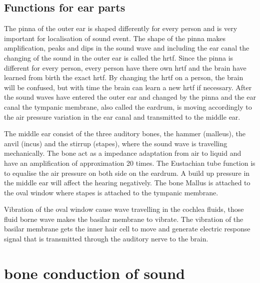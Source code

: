 \subsection{Functions for ear parts}
The pinna of the outer ear is shaped differently for every person and is very important for localisation of sound event. The shape of the pinna makes amplification, peaks and dips in the sound wave and including the ear canal the changing of the sound in the outer ear is called the \gls{hrtf}. Since the pinna is different for every person, every person have there own \gls{hrtf} and the brain have learned from birth the exact \gls{hrtf}. By changing the \gls{hrtf} on a person, the brain will be confused, but with time the brain can learn a new \gls{hrtf} if necessary. After the sound waves have entered the outer ear and changed by the pinna and the ear canal the tympanic membrane, also called the eardrum, is moving accordingly to the air pressure variation in the ear canal and transmitted to the middle ear.  

The middle ear consist of the three auditory bones, the hammer (malleus), the anvil (incus) and the stirrup (stapes), where the sound wave is travelling mechanically. The bone act as a impedance adaptation from air to liquid and have an amplification of approximation 20 times. The Eustachian tube function is to equalise the air pressure on both side on the eardrum. A build up pressure in the middle ear will affect the hearing negatively. The bone Mallus is attached to the oval window where stapes is attached to the tympanic membrane.

Vibration of the oval window cause wave travelling in the cochlea fluids, those fluid borne wave makes the basilar membrane to vibrate. The vibration of the basilar membrane gets the inner hair cell to move and generate electric response signal that is transmitted through the auditory nerve to the brain.



\section{bone conduction of sound}

